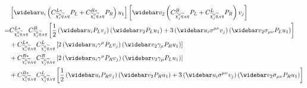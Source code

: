 \documentclass[english,notitlepage]{article}
\begin{document}
    \begin{align}
        \nonumber
          & \bclosed{\wbar{u}_i \pclosed{C^{L*}_{\nino[i]\wtilde{q}_A q} P_L + C^{R*}_{\nino[i]\wtilde{q}_A q} P_R} u_1}
        \bclosed{\wbar{v}_2 \pclosed{C^{R}_{\nino[j]\wtilde{q}_A q} P_L + C^{L}_{\nino[j]\wtilde{q}_A q} P_R} v_j}                                                                                                                                    \\
        \nonumber
        = & C^{L*}_{\nino[i]\wtilde{q}_A q}C^{R}_{\nino[j]\wtilde{q}_A q} \bclosed{\frac{1}{2} \pclosed{\wbar{u}_i P_L v_j} \pclosed{\wbar{v}_2 P_L u_1} + 3\pclosed{\wbar{u}_i \sigma^{\mu\nu} v_j} \pclosed{\wbar{v}_2 \sigma_{\mu\nu} P_L u_1} }   \\
        \nonumber
          & + C^{L*}_{\nino[i]\wtilde{q}_A q}C^{L}_{\nino[j]\wtilde{q}_A q} \bclosed{2 \pclosed{\wbar{u}_i \gamma^\mu P_L v_j} \pclosed{\wbar{v}_2 \gamma_\mu P_R u_1}}                                                                               \\
        \nonumber
          & + C^{R*}_{\nino[i]\wtilde{q}_A q}C^{R}_{\nino[j]\wtilde{q}_A q} \bclosed{2 \pclosed{\wbar{u}_i \gamma^\mu P_R v_j} \pclosed{\wbar{v}_2 \gamma_\mu P_L u_1}}                                                                               \\
          & + C^{R*}_{\nino[i]\wtilde{q}_A q}C^{L}_{\nino[j]\wtilde{q}_A q} \bclosed{\frac{1}{2} \pclosed{\wbar{u}_i P_R v_j} \pclosed{\wbar{v}_2 P_R u_1} + 3\pclosed{\wbar{u}_i \sigma^{\mu\nu} v_j} \pclosed{\wbar{v}_2 \sigma_{\mu\nu} P_R u_1} }
    \end{align}
\end{document}
